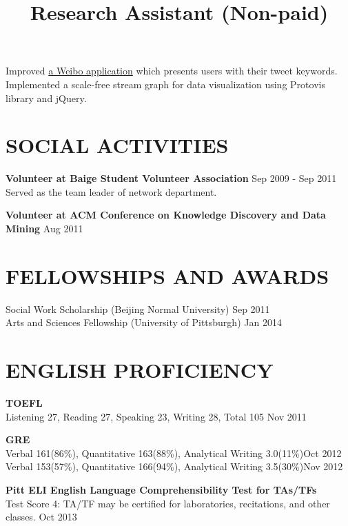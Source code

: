 \begin{resume}
\title{\textbf{Research Assistant (Non-paid)}}
\begin{position}
	Improved \href{http://app.thunlp.org/weibo/index.jsp}{a Weibo application} which presents users with their tweet keywords.\\
	Implemented a scale-free stream graph for data visualization using Protovis library and jQuery.
\end{position}


\section{\textsc{SOCIAL ACTIVITIES}}

\textbf{Volunteer at Baige Student Volunteer Association} \hfill Sep 2009 - Sep 2011\\
   Served as the team leader of network department.

\textbf{Volunteer at ACM Conference on Knowledge Discovery and Data Mining} \hfill Aug 2011






\section{\textsc{FELLOWSHIPS AND AWARDS}}
Social Work Scholarship (Beijing Normal University)  \hfill Sep 2011\\
Arts and Sciences Fellowship (University of Pittsburgh) \hfill Jan 2014




\section{\textsc{ENGLISH PROFICIENCY}}
\textbf{TOEFL}\\
Listening 27, Reading 27, Speaking 23, Writing 28, Total 105 \hfill Nov 2011

\textbf{GRE}\\
Verbal 161(86\%), Quantitative 163(88\%), Analytical Writing 3.0(11\%)\hfill Oct 2012\\
Verbal 153(57\%), Quantitative 166(94\%), Analytical Writing 3.5(30\%)\hfill Nov 2012

\textbf{Pitt ELI English Language Comprehensibility Test for TAs/TFs}\\
Test Score 4: TA/TF may be certified for laboratories, recitations, and other classes. \hfill Oct 2013




\end{resume}

